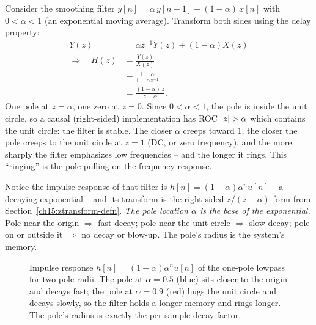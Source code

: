 \begin{example}
\label{ch15:ex-onepole}
Consider the smoothing filter $y[n] = \alpha\,y[n-1] + (1-\alpha)\,x[n]$ with
$0<\alpha<1$ (an exponential moving average). Transform both sides using the delay
property:
\begin{align*}
  Y(z) &= \alpha z^{-1} Y(z) + (1-\alpha) X(z) \\
  \Longrightarrow\quad
  H(z) &= \frac{Y(z)}{X(z)} \\
       &= \frac{1-\alpha}{1 - \alpha z^{-1}} \\
       &= \frac{(1-\alpha)\,z}{z - \alpha}.
\end{align*}
One pole at $z=\alpha$, one zero at $z=0$. Since $0<\alpha<1$, the pole is inside the unit
circle, so a causal (right-sided) implementation has ROC $\lvert z\rvert>\alpha$ which contains
the unit circle: the filter is stable. The closer $\alpha$ creeps toward $1$, the closer
the pole creeps to the unit circle at $z=1$ (DC, or zero frequency), and the more sharply the filter
emphasizes low frequencies -- and the longer it rings. This ``ringing'' is
the pole pulling on the frequency response.
\end{example}

\begin{connectionbox}
Notice the impulse response of that filter is $h[n]=(1-\alpha)\alpha^n u[n]$ -- a decaying
exponential -- and its transform is the right-sided $z/(z-\alpha)$ form from
Section~\ref{ch15:ztransform-defn}. \emph{The pole location $\alpha$ is the base of the
exponential.} Pole near the origin $\Rightarrow$ fast decay; pole near the unit circle
$\Rightarrow$ slow decay; pole on or outside it $\Rightarrow$ no decay or blow-up. The
pole's radius is the system's memory.
\end{connectionbox}

\begin{figure}[H]
\centering
{}
\caption{Impulse response $h[n]=(1-\alpha)\alpha^n u[n]$ of the one-pole lowpass for two
pole radii. The pole at $\alpha=0.5$ (blue) sits closer to the origin and decays fast; the
pole at $\alpha=0.9$ (red) hugs the unit circle and decays slowly, so the filter holds a
longer memory and rings longer. The pole's radius is exactly the per-sample decay factor.}
\label{ch15:fig-impulse}
\end{figure}

